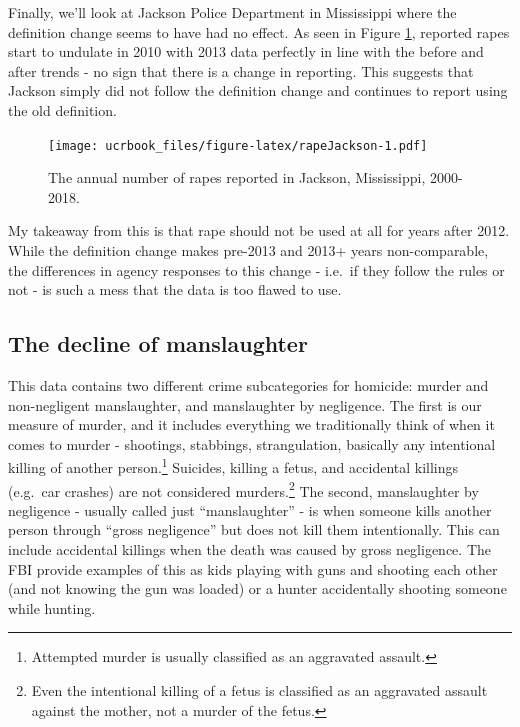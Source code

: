 \documentclass[
  12pt,
  openany]{book}
\begin{document}
Finally, we'll look at Jackson Police Department in Mississippi where the definition change seems to have had no effect. As seen in Figure \ref{fig:rapeJackson}, reported rapes start to undulate in 2010 with 2013 data perfectly in line with the before and after trends - no sign that there is a change in reporting. This suggests that Jackson simply did not follow the definition change and continues to report using the old definition.

\begin{figure}
\centering
\texttt{[image: ucrbook\_files/figure-latex/rapeJackson-1.pdf]}
\caption{\label{fig:rapeJackson}The annual number of rapes reported in Jackson, Mississippi, 2000-2018.}
\end{figure}

My takeaway from this is that rape should not be used at all for years after 2012. While the definition change makes pre-2013 and 2013+ years non-comparable, the differences in agency responses to this change - i.e.~if they follow the rules or not - is such a mess that the data is too flawed to use.

\hypertarget{the-decline-of-manslaughter}{%
\subsection{The decline of manslaughter}\label{the-decline-of-manslaughter}}

This data contains two different crime subcategories for homicide: murder and non-negligent manslaughter, and manslaughter by negligence. The first is our measure of murder, and it includes everything we traditionally think of when it comes to murder - shootings, stabbings, strangulation, basically any intentional killing of another person.\footnote{Attempted murder is usually classified as an aggravated assault.} Suicides, killing a fetus, and accidental killings (e.g.~car crashes) are not considered murders.\footnote{Even the intentional killing of a fetus is classified as an aggravated assault against the mother, not a murder of the fetus.} The second, manslaughter by negligence - usually called just ``manslaughter'' - is when someone kills another person through ``gross negligence'' but does not kill them intentionally. This can include accidental killings when the death was caused by gross negligence. The FBI provide examples of this as kids playing with guns and shooting each other (and not knowing the gun was loaded) or a hunter accidentally shooting someone while hunting.
\end{document}
